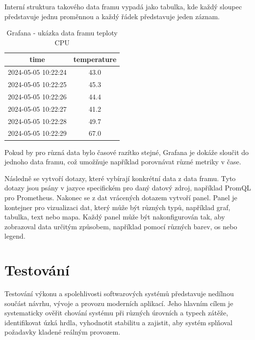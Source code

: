 Interní struktura takového data framu vypadá jako tabulka, kde každý sloupec představuje jednu proměnnou a každý řádek představuje jeden záznam.
\begin{table}[ht!]
\centering
\begin{tabular}{||c | c||} 
    \hline
    \textbf{time} & \textbf{temperature} \\ [0.5ex] 
    \hline\hline
    2024-05-05 10:22:24 & 43.0 \\ 
    \hline
    2024-05-05 10:22:25 & 45.3 \\
    \hline
    2024-05-05 10:22:26 & 44.4 \\
    \hline
    2024-05-05 10:22:27 & 41.2 \\
    \hline
    2024-05-05 10:22:28 & 49.7 \\
    \hline
    2024-05-05 10:22:29 & 67.0 \\
    \hline
\end{tabular}
\caption{Grafana - ukázka data framu teploty CPU}
\label{table:3}
\end{table}

Pokud by pro různá data bylo časové razítko stejné, Grafana je dokáže sloučit do jednoho data framu, což umožňuje například porovnávat různé metriky v čase. \cite{grafanadocs}

Následně se vytvoří dotazy, které vybírají konkrétní data z data framu. Tyto dotazy jsou psány v jazyce specifickém pro daný datový zdroj, například PromQL pro Prometheus. \cite{grafanadocs}
Nakonec se z dat vrácených dotazem vytvoří panel. Panel je kontejner pro vizualizaci dat, který může být různých typů, například graf, tabulka, text nebo mapa. \cite{grafanadocs}
Každý panel může být nakonfigurován tak, aby zobrazoval data určitým způsobem, například pomocí různých barev, os nebo legend. \cite{grafanadocs}

\section{Testování}

Testování výkonu a spolehlivosti softwarových systémů představuje nedílnou součást návrhu,
vývoje a provozu moderních aplikací. Jeho hlavním cílem je systematicky ověřit chování systému
při různých úrovních a typech zátěže, identifikovat úzká hrdla, vyhodnotit stabilitu a zajistit,
aby systém splňoval požadavky kladené reálným provozem.

